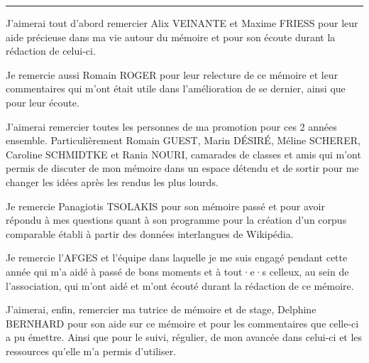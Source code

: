 \noindent\rule{\textwidth}{0.4pt}

J'aimerai tout d'abord remercier {Alix VEINANTE} et {Maxime FRIESS} pour leur aide précieuse dans ma vie autour du mémoire et pour son écoute durant la
rédaction de celui-ci. 

Je remercie aussi {Romain ROGER} pour leur relecture de ce mémoire et leur commentaires qui m'ont était utile dans
l'amélioration de se dernier, ainsi que pour leur écoute. 

J'aimerai remercier toutes les personnes de ma promotion pour ces 2 années ensemble. Particulièrement {Romain GUEST}, {Marin DÉSIRÉ},
{Méline SCHERER}, {Caroline SCHMIDTKE} et {Rania NOURI}, camarades de classes et amis qui m'ont permis de discuter de mon mémoire dans un espace détendu
et de sortir pour me changer les idées après les rendus les plus lourds.

Je remercie {Panagiotis TSOLAKIS} pour son mémoire passé et pour avoir
répondu à mes questions quant à son programme pour la création d'un corpus comparable établi à partir des données interlangues
de Wikipédia.

Je remercie l'AFGES et l'équipe dans laquelle je me suis engagé pendant cette année qui m'a aidé à passé de bons moments et à tout·e·s
celleux, au sein de l'association, qui m'ont aidé et m'ont écouté durant la rédaction de ce mémoire.

J'aimerai, enfin, remercier ma tutrice de mémoire et de stage, {Delphine BERNHARD} pour son aide sur ce mémoire et pour les commentaires
que celle-ci a pu émettre. Ainsi que pour le suivi, régulier, de mon avancée dans celui-ci et les ressources qu'elle m'a permis
d'utiliser.

\thispagestyle{empty}
\setcounter{page}{0}
\newpage